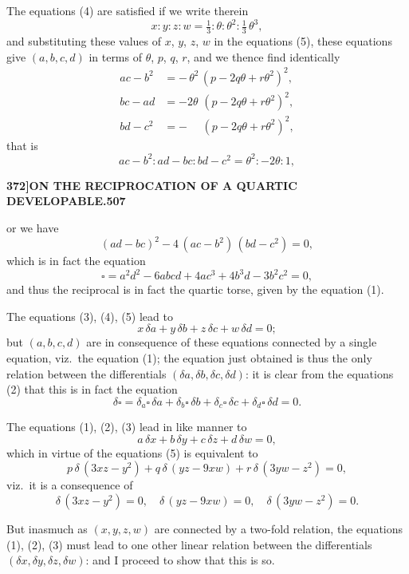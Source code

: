 \documentclass[11pt,a4paper]{article}
\begin{document}
The equations (4) are satisfied if we write therein
\[
x : y : z : w = \tfrac{1}{3} : \theta : \theta^{2} : \tfrac{1}{3}\,\theta^{3},
\]
and substituting these values of $x$, $y$, $z$, $w$ in the equations (5), these equations give $(a, b, c, d)$ in terms of $\theta$, $p$, $q$, $r$, and we thence find identically
\begin{align*}
ac - b^{2} &= -\,\theta^{2}\,(p - 2q\theta + r\theta^{2})^{2},\\
bc - ad &= -2\theta\,\,(p - 2q\theta + r\theta^{2})^{2},\\
bd - c^{2} &= -\quad\,\,(p - 2q\theta + r\theta^{2})^{2},
\end{align*}
that is
\[
ac - b^{2} : ad - bc : bd - c^{2} = \theta^{2} : -2\theta : 1,
\]

\newpage
\begin{flushright}
\textbf{372]\hspace{1em}ON THE RECIPROCATION OF A QUARTIC DEVELOPABLE.\hfill507}
\end{flushright}

\vspace{12pt}

\noindent
or we have
\[
(ad - bc)^{2} - 4\,(ac - b^{2})\,(bd - c^{2}) = 0,
\]
which is in fact the equation
\[
\square = a^{2}d^{2} - 6abcd + 4ac^{3} + 4b^{3}d - 3b^{2}c^{2} = 0, \tag{1}
\]
and thus the reciprocal is in fact the quartic torse, given by the equation (1).

The equations (3), (4), (5) lead to
\[
x\,\delta a + y\,\delta b + z\,\delta c + w\,\delta d = 0;
\]
but $(a, b, c, d)$ are in consequence of these equations connected by a single equation, viz.~the equation (1); the equation just obtained is thus the only relation between the differentials $(\delta a, \delta b, \delta c, \delta d)$: it is clear from the equations (2) that this is in fact the equation
\[
\delta\square = \delta_{a}\square\,\delta a + \delta_{b}\square\,\delta b + \delta_{c}\square\,\delta c + \delta_{d}\square\,\delta d = 0.
\]

The equations (1), (2), (3) lead in like manner to
\[
a\,\delta x + b\,\delta y + c\,\delta z + d\,\delta w = 0,
\]
which in virtue of the equations (5) is equivalent to
\[
p\,\delta\,(3xz - y^{2}) + q\,\delta\,(yz - 9xw) + r\,\delta\,(3yw - z^{2}) = 0,
\]
viz.~it is a consequence of
\[
\delta\,(3xz - y^{2}) = 0,\quad \delta\,(yz - 9xw) = 0,\quad \delta\,(3yw - z^{2}) = 0.
\]

But inasmuch as $(x, y, z, w)$ are connected by a two-fold relation, the equations (1), (2), (3) must lead to one other linear relation between the differentials $(\delta x, \delta y, \delta z, \delta w)$: and I proceed to show that this is so.
\end{document}
